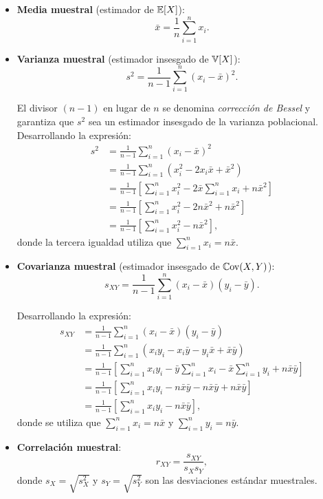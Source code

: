 \begin{itemize}
  \item \textbf{Media muestral} (estimador de $\mathbb{E}[X]$):
  \[
  \bar{x} = \frac{1}{n}\sum_{i=1}^n x_i.
  \]
  
  \item \textbf{Varianza muestral} (estimador insesgado de $\mathbb{V}[X]$):
  \[
  s^2 = \frac{1}{n-1}\sum_{i=1}^n (x_i - \bar{x})^2.
  \]
  
  El divisor $(n-1)$ en lugar de $n$ se denomina \textit{corrección de Bessel} y garantiza que $s^2$ sea un estimador insesgado de la varianza poblacional. Desarrollando la expresión:
  \begin{align*}
  s^2 &= \frac{1}{n-1}\sum_{i=1}^n (x_i - \bar{x})^2\\
      &= \frac{1}{n-1}\sum_{i=1}^n (x_i^2 - 2x_i\bar{x} + \bar{x}^2)\\
      &= \frac{1}{n-1}\left[\sum_{i=1}^n x_i^2 - 2\bar{x}\sum_{i=1}^n x_i + n\bar{x}^2\right]\\
      &= \frac{1}{n-1}\left[\sum_{i=1}^n x_i^2 - 2n\bar{x}^2 + n\bar{x}^2\right]\\
      &= \frac{1}{n-1}\left[\sum_{i=1}^n x_i^2 - n\bar{x}^2\right],
  \end{align*}
  donde la tercera igualdad utiliza que $\sum_{i=1}^n x_i = n\bar{x}$.
  
  \item \textbf{Covarianza muestral} (estimador insesgado de $\mathbb{C}\text{ov}(X,Y)$):
  \[
  s_{XY} = \frac{1}{n-1}\sum_{i=1}^n (x_i - \bar{x})(y_i - \bar{y}).
  \]
  
  Desarrollando la expresión:
  \begin{align*}
  s_{XY} &= \frac{1}{n-1}\sum_{i=1}^n (x_i - \bar{x})(y_i - \bar{y})\\
         &= \frac{1}{n-1}\sum_{i=1}^n (x_i y_i - x_i\bar{y} - y_i\bar{x} + \bar{x}\bar{y})\\
         &= \frac{1}{n-1}\left[\sum_{i=1}^n x_i y_i - \bar{y}\sum_{i=1}^n x_i - \bar{x}\sum_{i=1}^n y_i + n\bar{x}\bar{y}\right]\\
         &= \frac{1}{n-1}\left[\sum_{i=1}^n x_i y_i - n\bar{x}\bar{y} - n\bar{x}\bar{y} + n\bar{x}\bar{y}\right]\\
         &= \frac{1}{n-1}\left[\sum_{i=1}^n x_i y_i - n\bar{x}\bar{y}\right],
  \end{align*}
  donde se utiliza que $\sum_{i=1}^n x_i = n\bar{x}$ y $\sum_{i=1}^n y_i = n\bar{y}$.
  
  \item \textbf{Correlación muestral}:
  \[
  r_{XY} = \frac{s_{XY}}{s_X s_Y},
  \]
  donde $s_X = \sqrt{s_X^2}$ y $s_Y = \sqrt{s_Y^2}$ son las desviaciones estándar muestrales.
\end{itemize}



